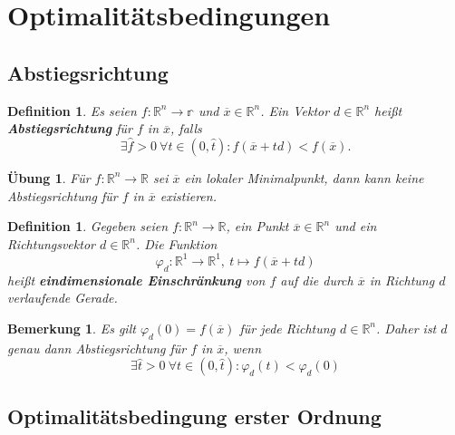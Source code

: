 \documentclass[11pt]{scrreprt}
\newcounter{thm}
\numberwithin{thm}{section}
\newtheorem{definition}[thm]{Definition}
\newtheorem{uebung}[thm]{Übung}
\newtheorem*{bemerkung*}{Bemerkung}
\begin{document}
\setcounter{chapter}{2}
\setcounter{section}{1}

\newpage

\section*{Optimalitätsbedingungen}

\subsection*{Abstiegsrichtung}

\begin{definition}
	Es seien $f \colon \mathbb{R}^n \rightarrow \mathbb{r}$ und $\overline{x} \in \mathbb{R}^n$. Ein Vektor $d \in \mathbb{R}^n$ heißt \textbf{Abstiegsrichtung} für $f$ in $\overline{x}$, falls
	$$ \exists \hat{f} > 0 ~\forall t \in (0, \hat{t}) \colon f(\overline{x} + td) < f(\overline{x}). $$
\end{definition}

\begin{uebung}
	Für $f \colon \mathbb{R}^n \rightarrow \mathbb{R}$ sei $\overline{x}$ ein lokaler Minimalpunkt, dann kann keine Abstiegsrichtung für $f$ in $\overline{x}$ existieren.
\end{uebung}

\begin{definition}
	Gegeben seien $f \colon \mathbb{R}^n \rightarrow \mathbb{R}$, ein Punkt $\overline{x} \in \mathbb{R}^n$ und ein Richtungsvektor $d \in \mathbb{R}^n$. Die Funktion
	$$ \varphi_d \colon \mathbb{R}^1 \rightarrow
	 \mathbb{R}^1, ~ t \mapsto f(\overline{x} + td) $$
	 heißt \textbf{eindimensionale Einschränkung} von $f$ auf die durch $\overline{x}$ in Richtung $d$ verlaufende Gerade.
\end{definition}

\begin{bemerkung*}
		Es gilt $\varphi_d(0) = f(\overline{x})$ für jede Richtung $d \in \mathbb{R}^n$. Daher ist $d$ genau dann Abstiegsrichtung für $f$ in $\overline{x}$, wenn
		$$ \exists \hat{t} > 0 ~\forall t \in (0, \hat{t}) \colon \varphi_d(t) < \varphi_d(0) $$
\end{bemerkung*}

\subsection*{Optimalitätsbedingung erster Ordnung}
\end{document}
